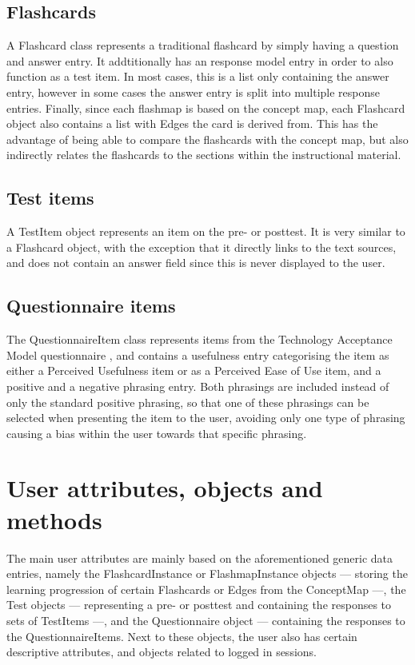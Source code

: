\subsection{Flashcards}

A Flashcard class represents a traditional flashcard by simply having a question and answer entry. It addtitionally has an response model entry in order to also function as a test item. In most cases, this is a list only containing the answer entry, however in some cases the answer entry is split into multiple response entries. Finally, since each flashmap is based on the concept map, each Flashcard object also contains a list with Edges the card is derived from. This has the advantage of being able to compare the flashcards with the concept map, but also indirectly relates the flashcards to the sections within the instructional material.

\subsection{Test items}

A TestItem object represents an item on the pre- or posttest. It is very similar to a Flashcard object, with the exception that it directly links to the text sources, and does not contain an answer field since this is never displayed to the user.

\subsection{Questionnaire items}

The QuestionnaireItem class represents items from the Technology Acceptance Model questionnaire \cite{tamq}, and contains a usefulness entry categorising the item as either a Perceived Usefulness item or as a Perceived Ease of Use item, and a positive and a negative phrasing entry. Both phrasings are included instead of only the standard positive phrasing, so that one of these phrasings can be selected when presenting the item to the user, avoiding only one type of phrasing causing a bias within the user towards that specific phrasing.

\section{User attributes, objects and methods}

The main user attributes are mainly based on the aforementioned generic data entries, namely the FlashcardInstance or FlashmapInstance objects --- storing the learning progression of certain Flashcards or Edges from the ConceptMap ---, the Test objects --- representing a pre- or posttest and containing the responses to sets of TestItems ---, and the Questionnaire object --- containing the responses to the QuestionnaireItems. Next to these objects, the user also has certain descriptive attributes, and objects related to logged in sessions.

